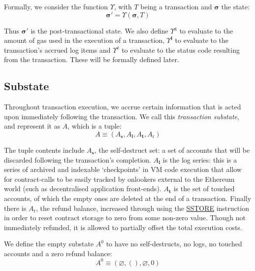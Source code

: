 \documentclass[9pt,oneside]{amsart}
\begin{document}
\begin{multicols}{2}
Formally, we consider the function \hyperlink{Upsilon_state_transition}{$\Upsilon$}, with $T$ being a transaction and $\boldsymbol{\sigma}$ the state:
\begin{equation}
\boldsymbol{\sigma}' = \Upsilon(\boldsymbol{\sigma}, T)
\end{equation}

Thus $\boldsymbol{\sigma}'$ is the post-transactional state. We also define \hyperlink{tx_total_gas_used_Upsilon_pow_g}{$\Upsilon^{\mathrm{g}}$} to evaluate to the amount of gas used in the execution of a transaction, \hyperlink{tx_logs_Upsilon_pow_l}{$\Upsilon^{\mathbf{l}}$} to evaluate to the transaction's accrued log items and \hyperlink{tx_status_Upsilon_pow_z}{$\Upsilon^{\mathrm{z}}$} to evaluate to the status code resulting from the transaction. These will be formally defined later.

\subsection{Substate}
Throughout transaction execution, we accrue certain information that is acted upon immediately following the transaction. We call this \textit{transaction substate}, and represent it as $A$, which is a tuple:
\begin{equation}
A \equiv (A_{\mathbf{s}}, A_{\mathbf{l}}, A_{\mathbf{t}}, A_{\mathrm{r}})
\end{equation}

\hypertarget{self_destruct_set_wordy_defn}{}The tuple contents include $A_{\mathbf{s}}$, the self-destruct set: a set of accounts that will be discarded following the transaction's completion.\hypertarget{tx_log_series_wordy_defn}{} $A_{\mathbf{l}}$ is the log series: this is a series of archived and indexable `checkpoints' in VM code execution that allow for contract-calls to be easily tracked by onlookers external to the Ethereum world (such as decentralised application front-ends).\hypertarget{tx_touched_accounts_wordy_defn}{} $A_{\mathbf{t}}$ is the set of touched accounts, of which the empty ones are deleted at the end of a transaction.\hypertarget{refund_balance_defn_words}{} Finally there is $A_{\mathrm{r}}$, the refund balance, increased through using the \hyperlink{SSTORE}{{\small SSTORE}} instruction in order to reset contract storage to zero from some non-zero value. Though not immediately refunded, it is allowed to partially offset the total execution costs.

We define the empty substate $A^0$ to have no self-destructs, no logs, no touched accounts and a zero refund balance:
\begin{equation}
A^0 \equiv (\varnothing, (), \varnothing, 0)
\end{equation}


\end{multicols}
\end{document}
